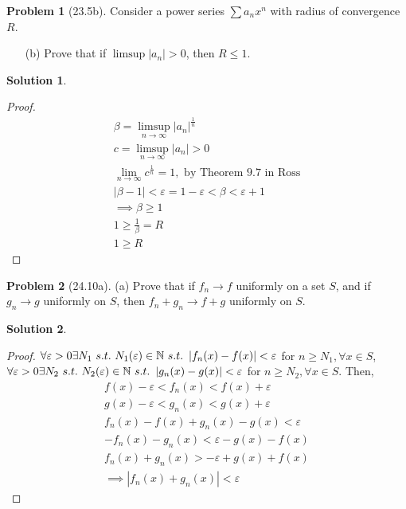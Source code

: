 \documentclass[12pt]{article}
\theoremstyle{definition} %
\newtheorem{solution}{Solution}
\newtheorem{problem}{Problem}
\theoremstyle{plain} %
\begin{document}
\begin{problem}[23.5b]
    Consider a power series \( \sum a_n x^n \) with radius of convergence \( R \).
\begin{enumerate}
    \item[(b)] Prove that if \( \limsup |a_n| > 0 \), then \( R \leq 1 \).
\end{enumerate}
\end{problem}
\begin{solution}
\begin{proof}
    \begin{align}
    \beta = \limsup_{n \to \infty} \left\vert a_{n} \right\vert^{\frac{1}{n}}\\[10pt] 
    c = \limsup_{n \to \infty} \left\vert a_{n} \right\vert>0\\[10pt] 
    \lim_{n \to \infty}c^{\frac{1}{n}} = 1, \text{ by Theorem 9.7 in Ross} \\[10pt] 
    \left\vert \beta-1 \right\vert <\varepsilon= 1-\varepsilon < \beta <\varepsilon+1 \\[10pt] 
    \implies \beta\geq 1\\[10pt] 
    1\geq \frac{1}{\beta}=R \\[10pt] 
    1\geq R
\end{align}
\end{proof} 
\end{solution}
\begin{problem}[24.10a]
    (a) Prove that if \( f_n \to f \) uniformly on a set \( S \), and if \( g_n \to g \) uniformly on \( S \), then \( f_n + g_n \to f + g \) uniformly on \( S \).
\end{problem}
\begin{solution}
    \begin{proof}
        \(\forall \varepsilon>0 \exists N_1 \ s.t. \ N_1(\varepsilon)\in \mathbb{\MakeUppercase{n}} \ s.t. \ \left\vert f_n(x)-f(x) \right\vert<\varepsilon \) for \(n\geq N_1, \forall x\in S\), 
    \(\forall \varepsilon>0 \exists N_2 \ s.t. \ N_2(\varepsilon)\in \mathbb{\MakeUppercase{n}} \ s.t. \ \left\vert g_n(x)-g(x) \right\vert<\varepsilon \) for \(n\geq N_2, \forall x\in S\). Then,
    \begin{align}
        f(x)-\varepsilon<f_{n}(x)<f(x)+\varepsilon \\[10pt] 
        g(x)-\varepsilon<g_{n}(x)<g(x)+\varepsilon \\[10pt]
        f_{n}(x)-f(x)+g_{n}(x)-g(x)<\varepsilon \\[10pt] 
        -f_{n}(x)-g_{n}(x)<\varepsilon-g(x)-f(x) \\[10pt] 
        f_{n}(x)+g_{n}(x)>-\varepsilon+g(x)+f(x) \\[10pt] 
        \implies \left\vert f_{n}(x)+g_{n}(x) \right\vert <\varepsilon
    \end{align}
    \end{proof}
\end{solution}
\end{document}
